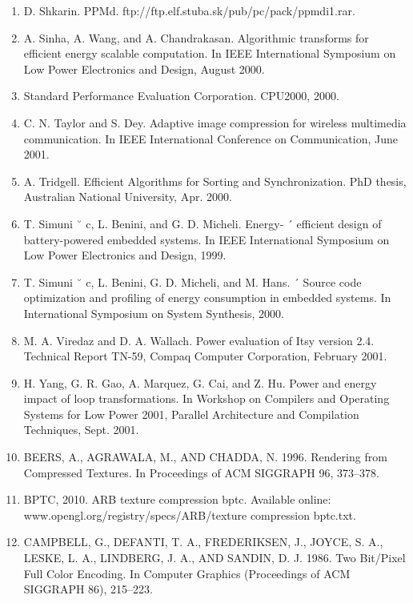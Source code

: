 \documentclass{article}
\begin{document}
\begin{enumerate}
	\item D. Shkarin. PPMd.
	ftp://ftp.elf.stuba.sk/pub/pc/pack/ppmdi1.rar.

	\item A. Sinha, A. Wang, and A. Chandrakasan. Algorithmic
	transforms for efficient energy scalable computation. In
	IEEE International Symposium on Low Power Electronics and Design, August 2000.

	\item Standard Performance Evaluation Corporation.
	CPU2000, 2000.

	\item C. N. Taylor and S. Dey. Adaptive image compression
	for wireless multimedia communication. In IEEE International Conference on Communication, June 2001.

	\item A. Tridgell. Efficient Algorithms for Sorting and Synchronization. PhD thesis, Australian National University,
	Apr. 2000.

	\item T. Simuni ˘ c, L. Benini, and G. D. Micheli. Energy- ´
	efficient design of battery-powered embedded systems.
	In IEEE International Symposium on Low Power Electronics and Design, 1999.

	\item T. Simuni ˘ c, L. Benini, G. D. Micheli, and M. Hans. ´
	Source code optimization and profiling of energy consumption in embedded systems. In International Symposium on System Synthesis, 2000.

	\item M. A. Viredaz and D. A. Wallach. Power evaluation of
	Itsy version 2.4. Technical Report TN-59, Compaq Computer Corporation, February 2001.

	\item H. Yang, G. R. Gao, A. Marquez, G. Cai, and Z. Hu.
	Power and energy impact of loop transformations. In
	Workshop on Compilers and Operating Systems for
	Low Power 2001, Parallel Architecture and Compilation
	Techniques, Sept. 2001.
	
	\item BEERS, A., AGRAWALA, M., AND CHADDA, N. 1996. Rendering
	from Compressed Textures. In Proceedings of ACM SIGGRAPH
	96, 373–378.

	\item BPTC, 2010. ARB texture compression bptc. Available online:
	www.opengl.org/registry/specs/ARB/texture compression bptc.txt.

	\item CAMPBELL, G., DEFANTI, T. A., FREDERIKSEN, J., JOYCE,
	S. A., LESKE, L. A., LINDBERG, J. A., AND SANDIN, D. J.
	1986. Two Bit/Pixel Full Color Encoding. In Computer Graphics (Proceedings of ACM SIGGRAPH 86), 215–223.
	

\end{enumerate}
\end{document}
